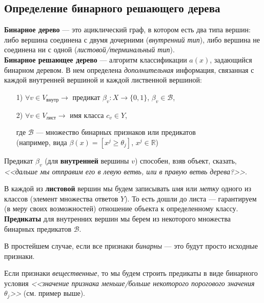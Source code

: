 \documentclass{article}
\begin{document}
\subsection{Определение бинарного решающего дерева}

\textbf{Бинарное дерево} --- это ациклический граф, в котором есть два типа вершин: либо вершина соединена с двумя дочерними (\textit{внутренний тип}), либо вершина не соединена ни с одной (\textit{листовой/терминальный тип}).
\\

\textbf{Бинарное решающее дерево} --- алгоритм классификации $a(x)$, задающийся бинарном деревом. В нем определена \textit{дополнительная} информация, связанная с каждой внутренней вершиной и каждой лиственной вершиной:

\begin{enumerate}
\item[1)] $\forall v \in V_{\text{внутр}} \rightarrow$ предикат
			$\beta_v: X \rightarrow \{0, 1\}$, $\beta_v\in \mathscr{B}$,

\item[2)] $\forall v \in V_{\text{лист}} \rightarrow$ имя класса $c_v \in Y$,

\item[] где $\mathscr{B}$ --- множество бинарных признаков или предикатов\\
		(например, вида $\beta(x) = [x^j \geqslant \theta_j]$, $x^j \in \mathbb{R}$)
\end{enumerate}

Предикат $\beta_v$ (для \textbf{внутренней} вершины $v$) способен, взяв объект, сказать, \textit{<<дальше мы отправим его в левую ветвь, или в правую ветвь дерева?>>}.

В каждой из \textbf{листовой} вершин мы будем записывать \textit{имя} или \textit{метку} одного из классов (элемент множества ответов $Y$). То есть дошли до листа --- гарантируем (в меру своих возможностей) отношение объекта к определенному классу.
\\

\textbf{Предикаты} для внутренних вершин мы берем из некоторого множества бинарных предикатов $\mathscr{B}$.

В простейшем случае, если все признаки \textit{бинарны} --- это будут просто исходные признаки.

Если признаки \textit{вещественные}, то мы будем строить предикаты в виде бинарного условия \textit{<<значение признака меньше/больше некоторого порогового значения $\theta_j$>>} (см. пример выше).
\\
\end{document}
